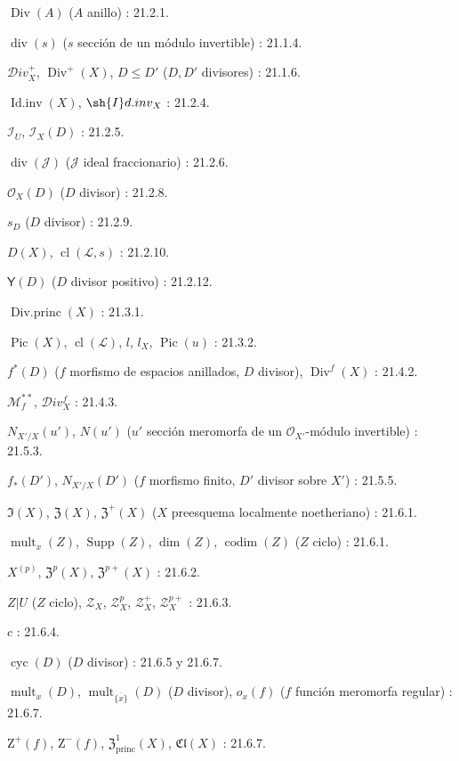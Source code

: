 $\operatorname{Div}(A)$ ($A$ anillo) : 21.2.1.

$\operatorname{div}(s)$ ($s$ sección de un módulo invertible) : 21.1.4.

$\mathcal{D}iv_X^+$, $\operatorname{Div}^+(X)$, $D\leq D'$
($D,D'$ divisores) : 21.1.6.

$\operatorname{Id.inv}(X)$, $\sh{I}d.inv_X$ : 21.2.4.

$\mathcal I_U$, $\mathcal I_X(D)$ : 21.2.5.

$\operatorname{div}(\mathcal J)$ ($\mathcal J$ ideal fraccionario) : 21.2.6.

$\mathcal O_X(D)$ ($D$ divisor) : 21.2.8.

$s_D$ ($D$ divisor) : 21.2.9.

$D(X)$, $\operatorname{cl}(\mathcal L,s)$ : 21.2.10.

$\boldsymbol{\mathsf{Y}}(D)$ ($D$ divisor positivo) : 21.2.12.

$\operatorname{Div.princ}(X)$ : 21.3.1.

$\operatorname{Pic}(X)$, $\operatorname{cl}(\mathcal L)$, $l$, $l_X$,
$\operatorname{Pic}(u)$ : 21.3.2.

$f^*(D)$ ($f$ morfismo de espacios anillados, $D$ divisor),
$\operatorname{Div}^f(X)$ : 21.4.2.

$\mathcal M_f^{**}$, $\mathcal{D}iv_X^f$ : 21.4.3.

$N_{X'/X}(u')$, $N(u')$
($u'$ sección meromorfa de un $\mathcal O_{X'}$-módulo invertible) : 21.5.3.

$f_*(D')$, $N_{X'/X}(D')$
($f$ morfismo finito, $D'$ divisor sobre $X'$) : 21.5.5.

$\mathfrak I(X)$, $\mathfrak Z(X)$, $\mathfrak Z^+(X)$
($X$ preesquema localmente noetheriano) : 21.6.1.

$\operatorname{mult}_x(Z)$, $\operatorname{Supp}(Z)$,
$\dim(Z)$, $\operatorname{codim}(Z)$ ($Z$ ciclo) : 21.6.1.

$X^{(p)}$, $\mathfrak Z^p(X)$, $\mathfrak Z^{p+}(X)$ : 21.6.2.

$Z|U$ ($Z$ ciclo), $\mathscr Z_X$, $\mathscr Z_X^p$,
$\mathscr Z_X^+$, $\mathscr Z_X^{p+}$ : 21.6.3.

$c$ : 21.6.4.

$\operatorname{cyc}(D)$ ($D$ divisor) : 21.6.5 y 21.6.7.

$\operatorname{mult}_x(D)$, $\operatorname{mult}_{\overline{\{x\}}}(D)$
($D$ divisor), $o_x(f)$ ($f$ función meromorfa regular) : 21.6.7.

$\mathrm Z^+(f)$, $\mathrm Z^-(f)$, $\mathfrak Z^1_{\mathrm{princ}}(X)$,
$\mathfrak{Cl}(X)$ : 21.6.7.

